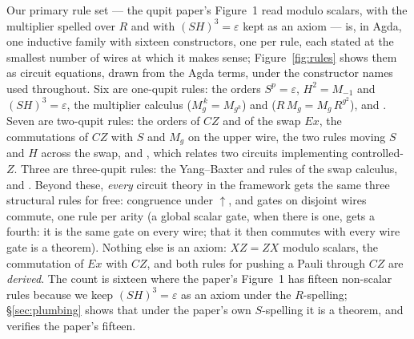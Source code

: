 Our primary rule set --- the qupit paper's Figure~1 read modulo
scalars, with the multiplier spelled over $R$ and with $(SH)^3 =
\varepsilon$ kept as an axiom --- is, in Agda, one inductive family
 with sixteen constructors, one per rule,
each stated at the smallest number of wires at which it makes sense;
Figure~\ref{fig:rules} shows them as circuit equations, drawn from the
Agda terms, under the constructor names used throughout.  Six are
one-qupit rules: the orders $S^{p} = \varepsilon$, $H^{2} = M_{-1}$ and
$(SH)^{3} = \varepsilon$, the multiplier calculus 
($M_g^{\,k} = M_{g^k}$) and  ($R\,M_g = M_g\,R^{g^2}$),
and .  Seven are two-qupit rules: the orders of $CZ$
and of the swap $\mathit{Ex}$, the commutations of $CZ$ with $S$ and
$M_g$ on the upper wire, the two rules moving $S$ and $H$ across the
swap, and , which relates two circuits implementing
controlled-$Z$.  Three are three-qupit rules: the Yang--Baxter and
 rules of the swap calculus, and .
Beyond these, \emph{every} circuit theory in
the framework gets the same three structural rules for free: congruence
under $\uparrow$, and gates on disjoint wires commute, one rule per
arity (a global scalar gate, when there is one, gets a fourth: it is
the same gate on every wire; that it then commutes with every wire
gate is a theorem).  Nothing else is an
axiom: $XZ = ZX$ modulo scalars, the commutation of $\mathit{Ex}$ with
$CZ$, and both rules for pushing a Pauli through $CZ$ are \emph{derived}.
The count is sixteen where the paper's Figure~1 has fifteen non-scalar
rules because we keep $(SH)^3 = \varepsilon$ as an axiom under the
$R$-spelling; \S\ref{sec:plumbing} shows that under the paper's own
$S$-spelling it is a theorem, and verifies the paper's fifteen.

